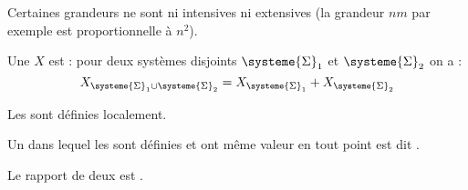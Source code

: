 \begin{remarque}
Certaines grandeurs ne sont ni intensives ni extensives (la grandeur $nm$ par exemple est proportionnelle à $n^2$).
\end{remarque}

\begin{propriete}
Une  $X$ est  : pour deux systèmes disjoints $\systeme{\Sigma}_1$ et $\systeme{\Sigma}_2$ on a :
\[X_{\systeme{\Sigma}_1 \cup \systeme{\Sigma}_2} = X_{\systeme{\Sigma}_1} + X_{\systeme{\Sigma}_2}\]
\end{propriete}

\begin{propriete}[admis]
Les  sont définies localement.
\end{propriete}

\begin{vocabulaire}
Un  dans lequel les  sont définies et ont même valeur en tout point est dit .
\end{vocabulaire}

\begin{propriete}
Le rapport de deux  est .
\end{propriete}
